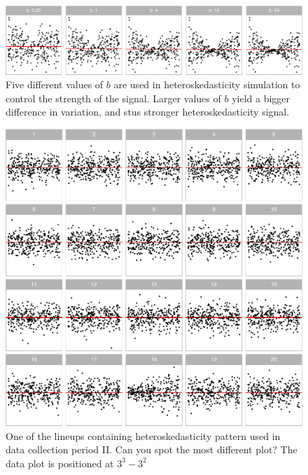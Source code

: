 \documentclass[]{interact}
\theoremstyle{plain}%
\theoremstyle{definition}
\theoremstyle{remark}
\begin{document}
\begin{figure}

{\centering \includegraphics[width=1\linewidth]{paper_comparison_files/figure-latex/different-b-1} 

}

\caption{Five different values of $b$ are used in heteroskedasticity simulation to control the strength of the signal. Larger values of $b$ yield a bigger difference in variation, and stus stronger heteroskedasticity signal.}\label{fig:different-b}
\end{figure}

\begin{figure}

{\centering \includegraphics[width=1\linewidth]{paper_comparison_files/figure-latex/example-heter-lineup-1} 

}

\caption{One of the lineups containing heteroskedasticity pattern used in data collection period II. Can you spot the most different plot? The data plot is positioned at $3^3 - 3^2$}\label{fig:example-heter-lineup}
\end{figure}
\end{document}
